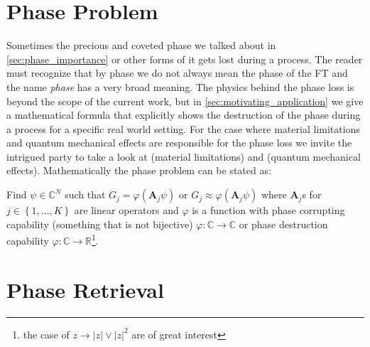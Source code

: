 \section{Phase Problem}
Sometimes the precious and coveted phase we talked about in \cref{sec:phase_importance} or other forms of it gets lost during a process. The reader must recognize 
that by phase we do not always mean the phase of the \ac{FT} and the name \emph{phase} has a very broad meaning. The physics behind the phase loss is beyond the 
scope of the current work, but in \cref{sec:motivating_application} we give a mathematical formula that explicitly shows the destruction of the phase 
during a process for a specific real world setting. For the case where material limitations and quantum mechanical effects are responsible for the phase loss we invite 
the intrigued party to take a look at \cite{Shechtman2015} (material limitations) and \cite{DGDS2018}\cite{FranzSchwabl2007} (quantum mechanical effects). 
Mathematically the phase problem can be stated as:
\begin{Pro}\label{pro:phase_problem}
Find $\psi \in \mathbb{C}^N$ such that $G_j = \varphi(\boldsymbol{A}_j\psi)$ or $G_j \approx \varphi(\boldsymbol{A}_j\psi)$ where 
$\boldsymbol{A}_j$s for $j \in \left\{1,\ldots,K\right\}$ are linear operators and $\varphi$ is a function with 
phase corrupting capability (something that is not bijective) $\varphi \colon \mathbb{C} \to \mathbb{C}$ or phase destruction capability 
$\varphi \colon \mathbb{C} \to \mathbb{R}$\footnote{the case of $z \rightarrow \left|z\right| \lor {\left|z\right|^2}$ 
are of great interest}.
\end{Pro} 






\section{Phase Retrieval}


